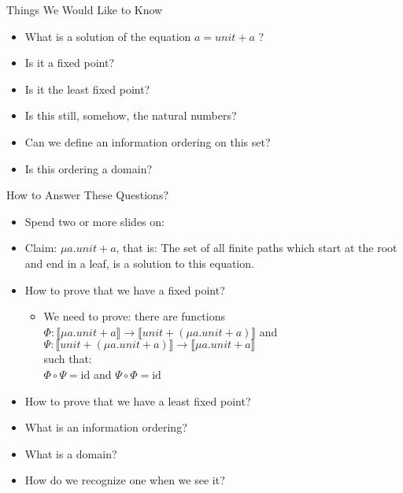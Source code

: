 \documentclass{beamer}
\newcommand{\arr}{\rightarrow}
\begin{document}
\begin{frame}{Things We Would Like to Know}

  \begin{itemize}
    \item What is a solution of the equation $a = unit + a$ ?
    \item Is it a fixed point?
    \item Is it the least fixed point?
    \item Is this still, somehow, the natural numbers?
    \item Can we define an information ordering on this set?
    \item Is this ordering a domain?
  \end{itemize}

\end{frame}


\begin{frame}{How to Answer These Questions?}

  \begin{itemize}
    \item Spend two or more slides on:
    \item Claim: $\mu a . unit + a$, that is: The set of all finite paths which
          start at the root and end in a leaf, is a solution to this equation.
    \item How to prove that we have a fixed point?
    \begin{itemize}
      \item We need to prove: there are functions
            $\Phi : \llbracket \mu a . unit + a \rrbracket \arr \llbracket unit + (\mu a . unit + a) \rrbracket$
            and
            $\Psi : \llbracket unit + (\mu a . unit + a) \rrbracket \arr \llbracket \mu a . unit + a \rrbracket$ \\
            such that: \\
            $\Phi \circ \Psi = \text{id}$ and $\Psi \circ \Phi = \text{id}$
    \end{itemize}
    \item How to prove that we have a least fixed point?
    \item What is an information ordering?
    \item What is a domain?
    \item How do we recognize one when we see it?
  \end{itemize}

\end{frame}
\end{document}

